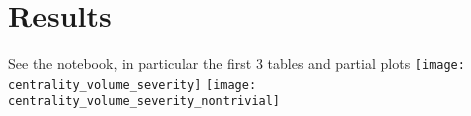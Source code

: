 \section{Results}

See the notebook, in particular the first 3 tables and partial plots
\texttt{[image: centrality\_volume\_severity]}
\texttt{[image: centrality\_volume\_severity\_nontrivial]}
